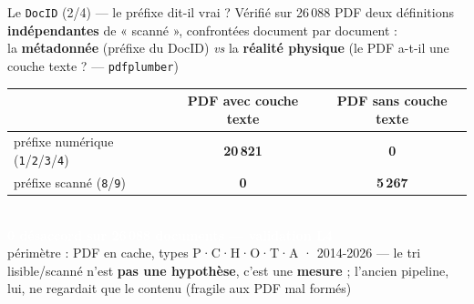 \documentclass[11pt,aspectratio=169]{beamer}
\newcommand{\co}[1]{\texttt{#1}}
\newcommand{\badge}[2]{\colorbox{#1}{\textcolor{white}{\footnotesize\textbf{#2}}}}
\begin{document}
\begin{frame}{Le \texttt{DocID} (2/4) — le préfixe dit-il vrai ? Vérifié sur 26\,088 PDF}
  \centering
  {\footnotesize deux définitions \textbf{indépendantes} de « scanné », confrontées
   document par document :}\\[1mm]
  {\footnotesize la \textbf{métadonnée} (préfixe du DocID) \emph{vs} la \textbf{réalité
   physique} (le PDF a-t-il une couche texte ? — \co{pdfplumber})}\\[3.5mm]
  {\normalsize\setlength{\tabcolsep}{10pt}\renewcommand{\arraystretch}{1.35}
  \begin{tabular}{l cc}
    \toprule
    & PDF \textbf{avec} couche texte & PDF \textbf{sans} couche texte \\
    \midrule
    préfixe numérique (\co{1}/\co{2}/\co{3}/\co{4}) &
      \textcolor{okgreen}{\textbf{20\,821}} & \textcolor{alertred}{\textbf{0}} \\
    préfixe scanné (\co{8}/\co{9}) &
      \textcolor{alertred}{\textbf{0}} & \textcolor{okgreen}{\textbf{5\,267}} \\
    \bottomrule
  \end{tabular}}\\[4mm]
  \badge{okgreen}{0 désaccord sur 26\,088 documents — validation L4}\\[2mm]
  {\scriptsize\color{black!60} périmètre : PDF en cache, types P·C·H·O·T·A · 2014-2026 —
   le tri lisible/scanné n'est \textbf{pas une hypothèse}, c'est une \textbf{mesure} ;
   l'ancien pipeline, lui, ne regardait que le contenu (fragile aux PDF mal formés)}
\end{frame}
\end{document}
